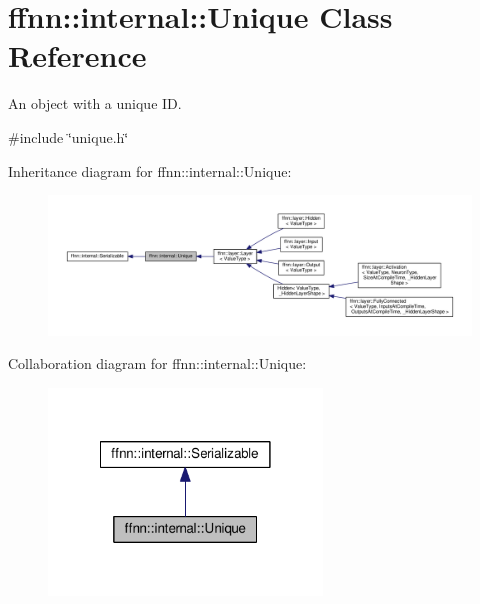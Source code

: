 \hypertarget{classffnn_1_1internal_1_1_unique}{\section{ffnn\-:\-:internal\-:\-:Unique Class Reference}
\label{classffnn_1_1internal_1_1_unique}
}


An object with a unique I\-D.  




{\ttfamily \#include \char`\"{}unique.\-h\char`\"{}}



Inheritance diagram for ffnn\-:\-:internal\-:\-:Unique\-:\nopagebreak
\begin{figure}[H]
\begin{center}
\leavevmode
\includegraphics[width=350pt]{classffnn_1_1internal_1_1_unique__inherit__graph}
\end{center}
\end{figure}


Collaboration diagram for ffnn\-:\-:internal\-:\-:Unique\-:\nopagebreak
\begin{figure}[H]
\begin{center}
\leavevmode
\includegraphics[width=206pt]{classffnn_1_1internal_1_1_unique__coll__graph}
\end{center}
\end{figure}
